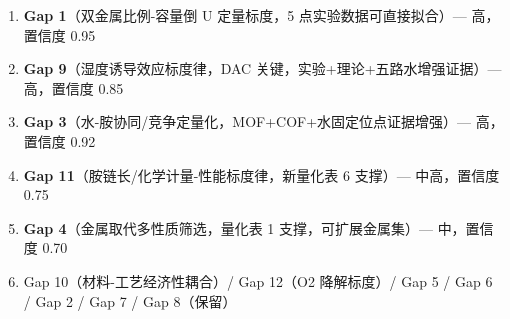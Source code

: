 \documentclass[12pt,a4paper]{ctexart}
\providecommand{\tightlist}{%
  \setlength{\itemsep}{0pt}\setlength{\parskip}{0pt}}
\begin{document}
\begin{enumerate}
\def\labelenumi{\arabic{enumi}.}
\tightlist
\item
  \textbf{Gap 1}（双金属比例-容量倒 U 定量标度，5 点实验数据可直接拟合）--- 高，置信度 0.95
\item
  \textbf{Gap 9}（湿度诱导效应标度律，DAC 关键，实验+理论+五路水增强证据）--- 高，置信度 0.85
\item
  \textbf{Gap 3}（水-胺协同/竞争定量化，MOF+COF+水固定位点证据增强）--- 高，置信度 0.92
\item
  \textbf{Gap 11}（胺链长/化学计量-性能标度律，新量化表 6 支撑）--- 中高，置信度 0.75
\item
  \textbf{Gap 4}（金属取代多性质筛选，量化表 1 支撑，可扩展金属集）--- 中，置信度 0.70
\item
  Gap 10（材料-工艺经济性耦合）/ Gap 12（O2 降解标度）/ Gap 5 / Gap 6 / Gap 2 / Gap 7 / Gap 8（保留）
\end{enumerate}

\printbibliography[title=参考文献]
\end{document}
